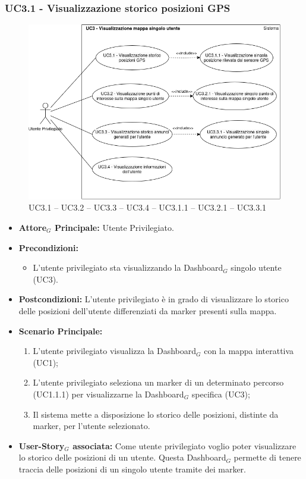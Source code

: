 \documentclass[11pt]{article}
\begin{document}
\begin{justify}

\subsubsection{\textbf{UC3.1 - Visualizzazione storico posizioni GPS}}
\begin{figure}[H]
    \centering
    \includegraphics[width=0.7\linewidth]{UC3.1234image.png}
    \caption{ UC3.1 -- UC3.2 -- UC3.3 -- UC3.4 -- UC3.1.1 -- UC3.2.1 -- UC3.3.1}
    \label{fig:UC3.1}
\end{figure}
\label{UC3.1}
\begin{itemize}
     \item \textbf{Attore$_G$ Principale:} Utente Privilegiato.
     \item \textbf{Precondizioni:}
        \begin{itemize}
    		\item L'utente privilegiato sta visualizzando la Dashboard$_G$ singolo utente (UC3).
        \end{itemize}
     \item \textbf{Postcondizioni:} L'utente privilegiato è in grado di visualizzare lo storico delle posizioni dell'utente differenziati da marker presenti sulla mappa.
     \item \textbf{Scenario Principale:}
        \begin{enumerate}
            \item L'utente privilegiato visualizza la Dashboard$_G$ con la mappa interattiva (UC1);
            \item L'utente privilegiato seleziona un marker di un determinato percorso (UC1.1.1) per visualizzarne la Dashboard$_G$ specifica (UC3);
            \item Il sistema mette a disposizione lo storico delle posizioni, distinte da marker, per l'utente selezionato.
        \end{enumerate}
     \item \textbf{User-Story$_G$ associata:}
     Come utente privilegiato voglio poter visualizzare lo storico delle posizioni di un utente. Questa Dashboard$_G$ permette di tenere traccia delle posizioni di un singolo utente tramite dei marker.
\end{itemize}

\end{justify}
\end{document}
